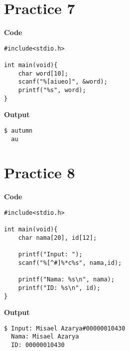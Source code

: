 \documentclass[a4paper, 11pt]{article}
\begin{document}
    \section*{Practice 7}
    \begin{minipage}[t]{0.5\textwidth}
        \large \textbf{Code}
        \begin{lstlisting}[style=code]
#include<stdio.h>

int main(void){
    char word[10];
    scanf("%[aiueo]", &word);
    printf("%s", word);
}
        \end{lstlisting}
    \end{minipage}
    \hspace{0.5cm}
    \begin{minipage}[t]{0.5\textwidth}
        \large \textbf{Output}
        \begin{lstlisting}[style=output]
$ autumn
  au
        \end{lstlisting}
    \end{minipage}

    \section*{Practice 8}
    \begin{minipage}[t]{0.5\textwidth}
        \large \textbf{Code}
        \begin{lstlisting}[style=code]
#include<stdio.h>

int main(void){
    char nama[20], id[12];

    printf("Input: ");
    scanf("%[^#]%*c%s", nama,id);

    printf("Nama: %s\n", nama);
    printf("ID: %s\n", id);
}
        \end{lstlisting}
    \end{minipage}
    \hspace{0.5cm}
    \begin{minipage}[t]{0.5\textwidth}
        \large \textbf{Output}
        \begin{lstlisting}[style=output]
$ Input: Misael Azarya#00000010430
  Nama: Misael Azarya
  ID: 00000010430
        \end{lstlisting}
    \end{minipage}
\end{document}
